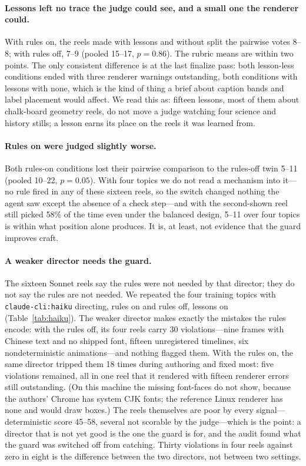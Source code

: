 \documentclass[11pt]{article}
\begin{document}
\paragraph{Lessons left no trace the judge could see, and a small one the renderer could.} With rules
on, the reels made with lessons and without split the pairwise votes 8--8; with rules off, 7--9
(pooled 15--17, $p=0.86$). The
rubric means are within two points. The only consistent difference is at the last finalize pass: both
lesson-less conditions ended with three renderer warnings outstanding, both conditions with lessons
with none, which is the kind of thing a brief about caption bands and label placement would affect.
We read this as: fifteen lessons, most of them about chalk-board geometry reels, do not move a judge
watching four science and history stills; a lesson earns its place on the reels it was learned from.

\paragraph{Rules on were judged slightly worse.} Both rules-on conditions lost their pairwise
comparison to the rules-off twin 5--11 (pooled 10--22, $p=0.05$). With four topics we do not read a mechanism into it---no
rule fired in any of these sixteen reels, so the switch changed nothing the agent saw except the
absence of a check step---and with the second-shown reel still picked 58\% of the time even under the
balanced design, 5--11 over four topics is within what position alone produces. It is, at least, not
evidence that the guard improves craft.

\paragraph{A weaker director needs the guard.} The sixteen Sonnet reels say the rules were not needed
by that director; they do not say the rules are not needed. We repeated the four training topics with
\texttt{claude-cli:haiku} directing, rules on and rules off, lessons on (Table~\ref{tab:haiku}). The
weaker director makes exactly the mistakes the rules encode: with the rules off, its four reels carry
30 violations---nine frames with Chinese text and no shipped font, fifteen unregistered timelines, six
nondeterministic animations---and nothing flagged them. With the rules on, the same director tripped
them 18 times during authoring and fixed most: five violations remained, all in one reel that it
rendered with fifteen renderer errors still outstanding. (On this machine the missing font-faces do
not show, because the authors' Chrome has system CJK fonts; the reference Linux renderer has none and
would draw boxes.) The reels themselves are poor by every signal---deterministic score 45--58, several
not scorable by the judge---which is the point: a director that is not yet good is the one the guard is
for, and the audit found what the guard was switched off from catching. Thirty violations in four
reels against zero in eight is the difference between the two directors, not between two settings.
\end{document}
